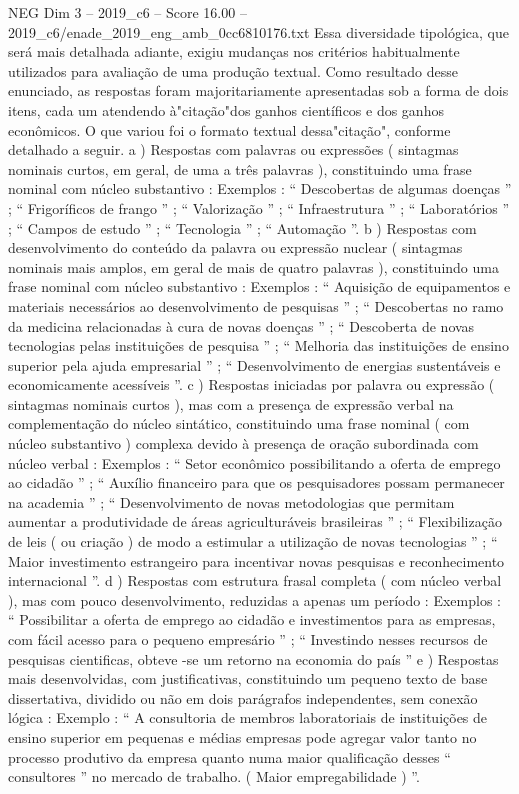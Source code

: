 \begin{textsample}{NEG Dim 3 – 2019\_c6 – Score 16.00 – 2019\_c6/enade\_2019\_eng\_amb\_0cc6810176.txt}
Essa diversidade tipológica, que será mais detalhada adiante, exigiu mudanças nos critérios habitualmente utilizados para avaliação de uma produção textual.
Como resultado desse enunciado, as respostas foram majoritariamente apresentadas sob a forma de dois itens, cada um atendendo à"citação"dos ganhos científicos e dos ganhos econômicos.
O que variou foi o formato textual dessa"citação", conforme detalhado a seguir. a ) Respostas com palavras ou expressões ( sintagmas nominais curtos, em geral, de uma a três palavras ), constituindo uma frase nominal com núcleo substantivo : Exemplos : “ Descobertas de algumas doenças ” ; “ Frigoríficos de frango ” ; “ Valorização ” ; “ Infraestrutura ” ; “ Laboratórios ” ; “ Campos de estudo ” ; “ Tecnologia ” ; “ Automação ”. b ) Respostas com desenvolvimento do conteúdo da palavra ou expressão nuclear ( sintagmas nominais mais amplos, em geral de mais de quatro palavras ), constituindo uma frase nominal com núcleo substantivo : Exemplos : “ Aquisição de equipamentos e materiais necessários ao desenvolvimento de pesquisas ” ; “ Descobertas no ramo da medicina relacionadas à cura de novas doenças ” ; “ Descoberta de novas tecnologias pelas instituições de pesquisa ” ; “ Melhoria das instituições de ensino superior pela ajuda empresarial ” ; “ Desenvolvimento de energias sustentáveis e economicamente acessíveis ”. c ) Respostas iniciadas por palavra ou expressão ( sintagmas nominais curtos ), mas com a presença de expressão verbal na complementação do núcleo sintático, constituindo uma frase nominal ( com núcleo substantivo ) complexa devido à presença de oração subordinada com núcleo verbal : Exemplos : “ Setor econômico possibilitando a oferta de emprego ao cidadão ” ; “ Auxílio financeiro para que os pesquisadores possam permanecer na academia ” ; “ Desenvolvimento de novas metodologias que permitam aumentar a produtividade de áreas agriculturáveis brasileiras ” ; “ Flexibilização de leis ( ou criação ) de modo a estimular a utilização de novas tecnologias ” ; “ Maior investimento estrangeiro para incentivar novas pesquisas e reconhecimento internacional ”. d ) Respostas com estrutura frasal completa ( com núcleo verbal ), mas com pouco desenvolvimento, reduzidas a apenas um período : Exemplos : “ Possibilitar a oferta de emprego ao cidadão e investimentos para as empresas, com fácil acesso para o pequeno empresário ” ; “ Investindo nesses recursos de pesquisas cientificas, obteve -se um retorno na economia do país ” e ) Respostas mais desenvolvidas, com justificativas, constituindo um pequeno texto de base dissertativa, dividido ou não em dois parágrafos independentes, sem conexão lógica : Exemplo : “ A consultoria de membros laboratoriais de instituições de ensino superior em pequenas e médias empresas pode agregar valor tanto no processo produtivo da empresa quanto numa maior qualificação desses “ consultores ” no mercado de trabalho. ( Maior empregabilidade ) ”.

\end{textsample}
